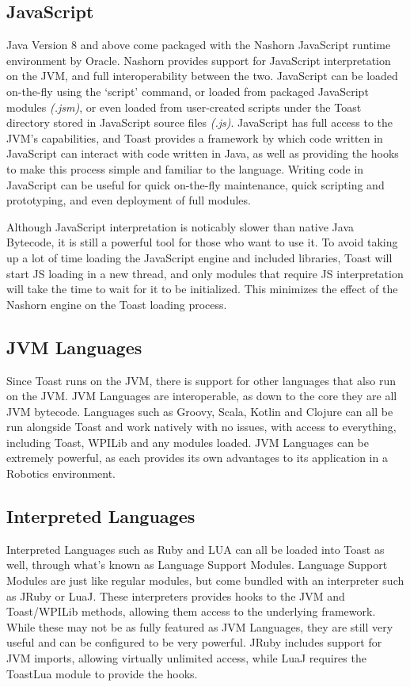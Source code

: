 \documentclass[a4paper,12pt]{article}
\begin{document}
\subsection{JavaScript}
Java Version 8 and above come packaged with the Nashorn JavaScript runtime environment by Oracle. Nashorn provides support for JavaScript interpretation on the JVM, and full interoperability between the two. JavaScript can be loaded on-the-fly using the `script' command, or loaded from packaged JavaScript modules \textit{(.jsm)}, or even loaded from user-created scripts under the Toast directory stored in JavaScript source files \textit{(.js)}. JavaScript has full access to the JVM's capabilities, and Toast provides a framework by which code written in JavaScript can interact with code written in Java, as well as providing the hooks to make this process simple and familiar to the language. Writing code in JavaScript can be useful for quick on-the-fly maintenance, quick scripting and prototyping, and even deployment of full modules. 

Although JavaScript interpretation is noticably slower than native Java Bytecode, it is still a powerful tool for those who want to use it. To avoid taking up a lot of time loading the JavaScript engine and included libraries, Toast will start JS loading in a new thread, and only modules that require JS interpretation will take the time to wait for it to be initialized. This minimizes the effect of the Nashorn engine on the Toast loading process.

\subsection{JVM Languages}
Since Toast runs on the JVM, there is support for other languages that also run on the JVM. JVM Languages are interoperable, as down to the core they are all JVM bytecode. Languages such as Groovy, Scala, Kotlin and Clojure can all be run alongside Toast and work natively with no issues, with access to everything, including Toast, WPILib and any modules loaded. JVM Languages can be extremely powerful, as each provides its own advantages to its application in a Robotics environment. 

\subsection{Interpreted Languages}
Interpreted Languages such as Ruby and LUA can all be loaded into Toast as well, through what's known as Language Support Modules. Language Support Modules are just like regular modules, but come bundled with an interpreter such as JRuby or LuaJ. These interpreters provides hooks to the JVM and Toast/WPILib methods, allowing them access to the underlying framework. While these may not be as fully featured as JVM Languages, they are still very useful and can be configured to be very powerful. JRuby includes support for JVM imports, allowing virtually unlimited access, while LuaJ requires the ToastLua module to provide the hooks. 
\end{document}
